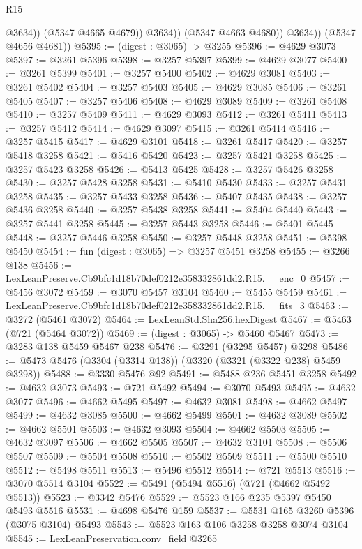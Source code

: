 \begin{lexlean}{R15}
\begin{coremodule}
                      @3634))
                  (@5347 @4665 @4679))
                @3634))
            (@5347 @4663 @4680))
          @3634))
      (@5347 @4656 @4681))
@5395 := (digest : @3065) -> @3255
@5396 := @4629 @3073
@5397 := @3261 @5396
@5398 := @3257 @5397
@5399 := @4629 @3077
@5400 := @3261 @5399
@5401 := @3257 @5400
@5402 := @4629 @3081
@5403 := @3261 @5402
@5404 := @3257 @5403
@5405 := @4629 @3085
@5406 := @3261 @5405
@5407 := @3257 @5406
@5408 := @4629 @3089
@5409 := @3261 @5408
@5410 := @3257 @5409
@5411 := @4629 @3093
@5412 := @3261 @5411
@5413 := @3257 @5412
@5414 := @4629 @3097
@5415 := @3261 @5414
@5416 := @3257 @5415
@5417 := @4629 @3101
@5418 := @3261 @5417
@5420 := @3257 @5418 @3258
@5421 := @5416 @5420
@5423 := @3257 @5421 @3258
@5425 := @3257 @5423 @3258
@5426 := @5413 @5425
@5428 := @3257 @5426 @3258
@5430 := @3257 @5428 @3258
@5431 := @5410 @5430
@5433 := @3257 @5431 @3258
@5435 := @3257 @5433 @3258
@5436 := @5407 @5435
@5438 := @3257 @5436 @3258
@5440 := @3257 @5438 @3258
@5441 := @5404 @5440
@5443 := @3257 @5441 @3258
@5445 := @3257 @5443 @3258
@5446 := @5401 @5445
@5448 := @3257 @5446 @3258
@5450 := @3257 @5448 @3258
@5451 := @5398 @5450
@5454 := fun (digest : @3065) => @3257 @5451 @3258
@5455 := @3266 @138
@5456 := LexLeanPreserve.Cb9bfc1d18b70def0212e358332861dd2.R15.__enc_0
@5457 := @5456 @3072
@5459 := @3070 @5457 @3104
@5460 := @5455 @5459
@5461 := LexLeanPreserve.Cb9bfc1d18b70def0212e358332861dd2.R15.__fits_3
@5463 := @3272 (@5461 @3072)
@5464 := LexLeanStd.Sha256.hexDigest
@5467 := @5463 (@721 (@5464 @3072))
@5469 := (digest : @3065) -> @5460 @5467
@5473 := @3283 @138 @5459 @5467 @238
@5476 := @3291 (@3295 @5457) @3298
@5486 := @5473 @5476 (@3304 (@3314 @138)) (@3320 (@3321 (@3322 @238) @5459 @3298))
@5488 := @3330 @5476 @92
@5491 := @5488 @236 @5451 @3258
@5492 := @4632 @3073
@5493 := @721 @5492
@5494 := @3070 @5493
@5495 := @4632 @3077
@5496 := @4662 @5495
@5497 := @4632 @3081
@5498 := @4662 @5497
@5499 := @4632 @3085
@5500 := @4662 @5499
@5501 := @4632 @3089
@5502 := @4662 @5501
@5503 := @4632 @3093
@5504 := @4662 @5503
@5505 := @4632 @3097
@5506 := @4662 @5505
@5507 := @4632 @3101
@5508 := @5506 @5507
@5509 := @5504 @5508
@5510 := @5502 @5509
@5511 := @5500 @5510
@5512 := @5498 @5511
@5513 := @5496 @5512
@5514 := @721 @5513
@5516 := @3070 @5514 @3104
@5522 := @5491 (@5494 @5516) (@721 (@4662 @5492 @5513))
@5523 := @3342 @5476
@5529 := @5523 @166 @235 @5397 @5450 @5493 @5516
@5531 := @4698 @5476 @159
@5537 := @5531 @165 @3260 @5396 (@3075 @3104) @5493
@5543 := @5523 @163 @106 @3258 @3258 @3074 @3104
@5545 := LexLeanPreservation.conv_field @3265

\end{coremodule}
\end{lexlean}
